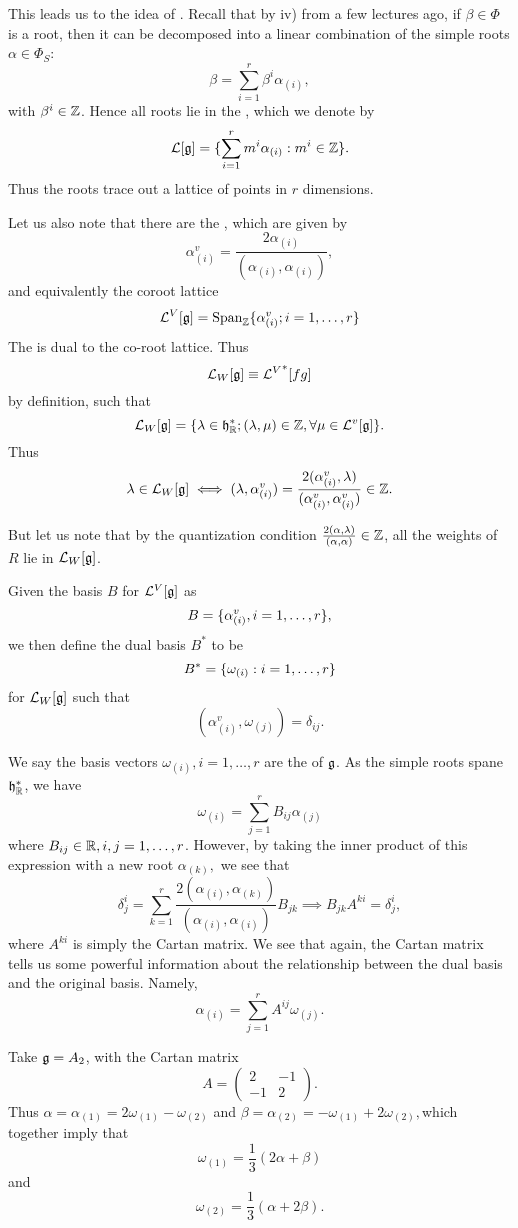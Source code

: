 This leads us to the idea of . Recall that by iv) from a few lectures ago, if $\beta \in \Phi$ is a root, then it can be decomposed into a linear combination of the simple roots $\alpha\in \Phi_S$:
$$\beta =\sum_{i=1}^r \beta^i \alpha_{(i)},$$
with $\beta^i \in \mathbb{Z}$. Hence all roots lie in the , which we denote by
$$\mathcal{L}[\mathfrak{g}]=\{\sum_{i=1}^r m^i \alpha_{(i)}:m^i \in \mathbb{Z}\}.$$
Thus the roots trace out a lattice of points in $r$ dimensions.
\begin{defn}
    Let us also note that there are the , which are given by
    $$\alpha^v_{(i)}=\frac{2\alpha_{(i)}}{(\alpha_{(i)},\alpha_{(i)})},$$
    and equivalently the coroot lattice
    $$\mathcal{L}^V[\mathfrak{g}]=\text{Span}_{\mathbb{Z}}\{\alpha_{(i)}^v ; i=1,\ldots,r\}$$
    The  is dual to the co-root lattice. Thus
    $$\mathcal L_W[\mathfrak{g}]\equiv {\mathcal L^V}^* [fg]$$
    by definition, such that
    $$\mathcal L_W[\mathfrak{g}]=\{\lambda\in \mathfrak{h}^*_{\mathbb{R}}; (\lambda,\mu)\in \mathbb{Z}, \forall \mu \in \mathcal L^v[\mathfrak{g}]\}.$$
    Thus $$\lambda \in \mathcal L_W[\mathfrak{g}] \iff (\lambda,\alpha^v_{(i)})=\frac{2(\alpha^v_{(i)},\lambda)}{(\alpha^v_{(i)},\alpha^v_{(i)})}\in \mathbb{Z}.$$
\end{defn}
But let us note that by the quantization condition $\frac{2(\alpha,\lambda)}{(\alpha,\alpha)}\in \mathbb{Z}$, all the weights of $R$ lie in $\mathcal L_W[\mathfrak{g}]$. 
\begin{defn}
Given the basis $B$ for $\mathcal L^V[\mathfrak{g}]$ as
$$B=\{\alpha_{(i)}^v,i=1,\ldots,r\},$$
we then define the dual basis $B^*$ to be
$$B^*=\{\omega_{(i)}:i=1,\ldots,r\}$$
for $\mathcal L_W[\mathfrak{g}]$ such that
$$(\alpha_{(i)}^v,\omega_{(j)})=\delta_{ij}.$$
\end{defn}
We say the basis vectors $\omega_{(i)},i=1,\ldots,r$ are the  of $\mathfrak{g}$. As the simple roots spane $\mathfrak{h}^*_{\mathbb{R}}$, we have
$$\omega_{(i)}=\sum_{j=1}^r B_{ij}\alpha_{(j)}$$
where $B_{ij}\in \mathbb{R},i,j=1,\ldots,r$. However, by taking the inner product of this expression with a new root $\alpha_{(k)},$ we see that
$$\delta^i_j = \sum_{k=1}^r \frac{2(\alpha_{(i)},\alpha_{(k)})}{(\alpha_{(i)},\alpha_{(i)})}B_{jk} \implies B_{jk}A^{ki}=\delta^i_j,$$
where $A^{ki}$ is simply the Cartan matrix. We see that again, the Cartan matrix tells us some powerful information about the relationship between the dual basis and the original basis. Namely,
$$\alpha_{(i)}=\sum_{j=1}^r A^{ij}\omega_{(j)}.$$
\begin{exm}
Take $\mathfrak{g}=A_2$, with the Cartan matrix
$$A=\begin{pmatrix}
2&-1\\-1&2
\end{pmatrix}.$$
Thus $\alpha=\alpha_{(1)}=2\omega_{(1)}-\omega_{(2)}$
and $\beta=\alpha_{(2)}=-\omega_{(1)}+2\omega_{(2)},$which together imply that
$$\omega_{(1)}=\frac{1}{3}(2\alpha+\beta)$$ and
$$\omega_{(2)}=\frac{1}{3}(\alpha+2\beta).$$
\end{exm}

